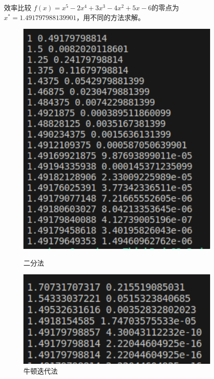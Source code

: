 \documentclass{beamer}
\begin{document}
\begin{frame}{效率比较}
    $f(x)=x^5-2x^4+3x^3-4x^2+5x-6$的零点为$x^*=1.491797988139901$，用不同的方法求解。

    \begin{figure}[H]
        \centering
        \begin{minipage}[t]{0.48\textwidth}
            \centering
            \includegraphics[width=0.9\textwidth]{pic/bisection.png}
            \caption{二分法}
        \end{minipage}
        \begin{minipage}[t]{0.48\textwidth}
            \centering
            \includegraphics[width=0.9\textwidth]{pic/newton.png}
            \caption{牛顿迭代法}
        \end{minipage}
    \end{figure}
\end{frame}
\end{document}
